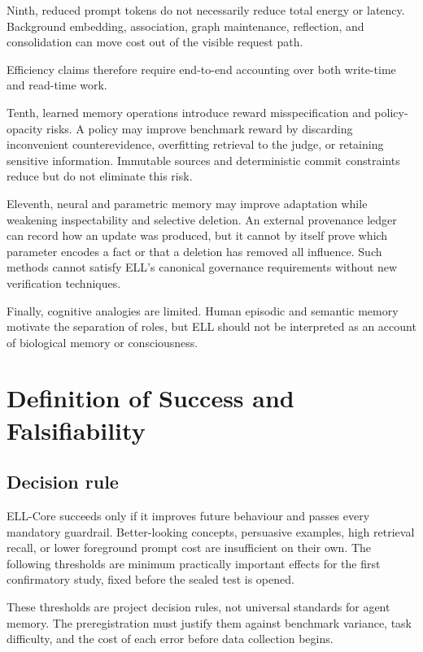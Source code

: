 \documentclass[
  english,
  a4paper,
  DIV=11,
  numbers=noendperiod]{scrreprt}
\begin{document}
Ninth, reduced prompt tokens do not necessarily reduce total energy or
latency. Background embedding, association, graph maintenance,
reflection, and consolidation can move cost out of the visible request
path.

Efficiency claims therefore require end-to-end accounting over both
write-time and read-time work.

Tenth, learned memory operations introduce reward misspecification and
policy-opacity risks. A policy may improve benchmark reward by
discarding inconvenient counterevidence, overfitting retrieval to the
judge, or retaining sensitive information. Immutable sources and
deterministic commit constraints reduce but do not eliminate this risk.

Eleventh, neural and parametric memory may improve adaptation while
weakening inspectability and selective deletion. An external provenance
ledger can record how an update was produced, but it cannot by itself
prove which parameter encodes a fact or that a deletion has removed all
influence. Such methods cannot satisfy ELL's canonical governance
requirements without new verification techniques.

Finally, cognitive analogies are limited. Human episodic and semantic
memory motivate the separation of roles, but ELL should not be
interpreted as an account of biological memory or consciousness.


\chapter{Definition of Success and
Falsifiability}\label{definition-of-success-and-falsifiability}

\section{Decision rule}\label{decision-rule}

ELL-Core succeeds only if it improves future behaviour and passes every
mandatory guardrail. Better-looking concepts, persuasive examples, high
retrieval recall, or lower foreground prompt cost are insufficient on
their own. The following thresholds are minimum practically important
effects for the first confirmatory study, fixed before the sealed test
is opened.

These thresholds are project decision rules, not universal standards for
agent memory. The preregistration must justify them against benchmark
variance, task difficulty, and the cost of each error before data
collection begins.
\end{document}
